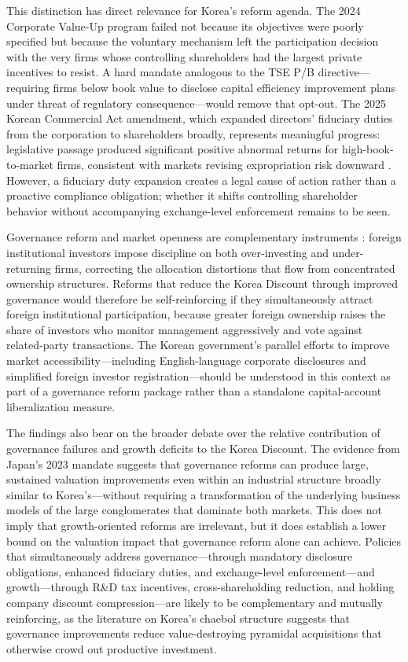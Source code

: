 This distinction has direct relevance for Korea's reform agenda. The 2024 Corporate Value-Up program failed not because its objectives were poorly specified but because the voluntary mechanism left the participation decision with the very firms whose controlling shareholders had the largest private incentives to resist. A hard mandate analogous to the TSE P/B directive---requiring firms below book value to disclose capital efficiency improvement plans under threat of regulatory consequence---would remove that opt-out. The 2025 Korean Commercial Act amendment, which expanded directors' fiduciary duties from the corporation to shareholders broadly, represents meaningful progress: legislative passage produced significant positive abnormal returns for high-book-to-market firms, consistent with markets revising expropriation risk downward \citep{kang_commercial_act_market_reactions}. However, a fiduciary duty expansion creates a legal cause of action rather than a proactive compliance obligation; whether it shifts controlling shareholder behavior without accompanying exchange-level enforcement remains to be seen.

Governance reform and market openness are complementary instruments \citep{joo_foreign_investors_value_up}: foreign institutional investors impose discipline on both over-investing and under-returning firms, correcting the allocation distortions that flow from concentrated ownership structures. Reforms that reduce the Korea Discount through improved governance would therefore be self-reinforcing if they simultaneously attract foreign institutional participation, because greater foreign ownership raises the share of investors who monitor management aggressively and vote against related-party transactions. The Korean government's parallel efforts to improve market accessibility---including English-language corporate disclosures and simplified foreign investor registration---should be understood in this context as part of a governance reform package rather than a standalone capital-account liberalization measure.

The findings also bear on the broader debate over the relative contribution of governance failures and growth deficits to the Korea Discount. The evidence from Japan's 2023 mandate suggests that governance reforms can produce large, sustained valuation improvements even within an industrial structure broadly similar to Korea's---without requiring a transformation of the underlying business models of the large conglomerates that dominate both markets. This does not imply that growth-oriented reforms are irrelevant, but it does establish a lower bound on the valuation impact that governance reform alone can achieve. Policies that simultaneously address governance---through mandatory disclosure obligations, enhanced fiduciary duties, and exchange-level enforcement---and growth---through R\&D tax incentives, cross-shareholding reduction, and holding company discount compression---are likely to be complementary and mutually reinforcing, as the literature on Korea's chaebol structure suggests that governance improvements reduce value-destroying pyramidal acquisitions that otherwise crowd out productive investment.

